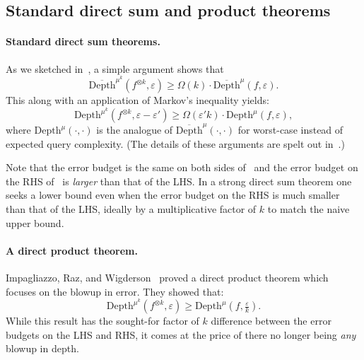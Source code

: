 \subsection{Standard direct sum and product theorems}

\paragraph{Standard direct sum theorems.} 

As we sketched in~, a simple argument shows that 
\begin{equation}
\overline{\mathrm{Depth}}^{\mu^k}(f^{\otimes k},\varepsilon) \ge \Omega(k) \cdot \overline{\mathrm{Depth}}^{\mu}(f,\varepsilon). \label{eq:BDK}
\end{equation} 
This along with an application of Markov's inequality yields: 
\begin{equation}
\mathrm{Depth}^{\mu^k}(f^{\otimes k},\varepsilon-\varepsilon') \ge \Omega(\varepsilon'k)\cdot \mathrm{Depth}^{\mu}(f,\varepsilon),    \label{eq:JKS}
\end{equation}
where $\mathrm{Depth}^{\mu}(\cdot ,\cdot)$ is the analogue of $\overline{\mathrm{Depth}}^{\mu}(\cdot,\cdot)$ for worst-case instead of expected query complexity. (The details of these arguments are spelt out in~\cite{JKS10,BDK18}.) 



Note that the error budget is the same on both sides of~ and the error budget on the RHS of~ is {\sl larger} than that of the LHS. In a strong direct sum theorem one seeks a lower bound even when the error budget on the RHS is much smaller than that of the LHS, ideally by a multiplicative factor of $k$ to match the naive upper bound.


\paragraph{A direct product theorem.} Impagliazzo, Raz, and Wigderson~\cite{IRW94} proved a direct product theorem which focuses on the blowup in error.  They showed that: 
\begin{equation} \mathrm{Depth}^{\mu^k}(f^{\otimes k},\varepsilon) \ge  \mathrm{Depth}^{\mu}(f,\tfrac{\varepsilon}{k}).\label{eq:IRW}
\end{equation}
While this result has the sought-for factor of $k$ difference between the error budgets on the LHS and RHS, it comes at the price of there no longer being {\sl any} blowup in depth. 
 
